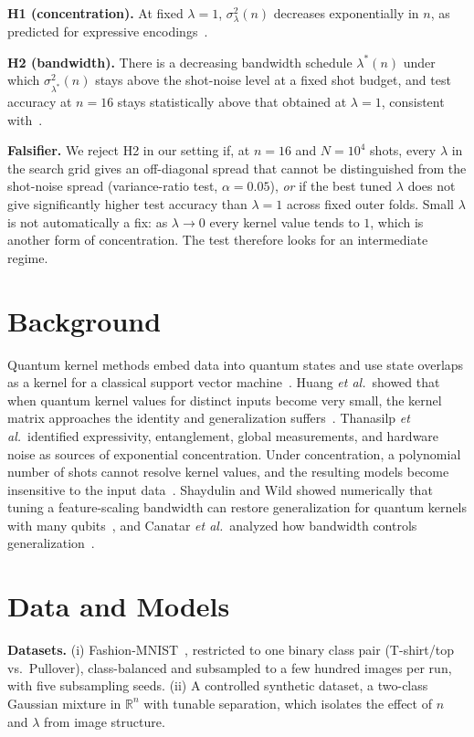 \documentclass[conference]{IEEEtran}
\begin{document}
\textbf{H1 (concentration).} At fixed $\lambda=1$, $\sigma^{2}_{\lambda}(n)$ decreases exponentially in $n$, as predicted for expressive encodings~\cite{thanasilp2024concentration}.

\textbf{H2 (bandwidth).} There is a decreasing bandwidth schedule $\lambda^{*}(n)$ under which $\sigma^{2}_{\lambda^{*}}(n)$ stays above the shot-noise level at a fixed shot budget, and test accuracy at $n=16$ stays statistically above that obtained at $\lambda=1$, consistent with~\cite{shaydulin2022bandwidth,canatar2022bandwidth}.

\textbf{Falsifier.} We reject H2 in our setting if, at $n=16$ and $N=10^{4}$ shots, every $\lambda$ in the search grid gives an off-diagonal spread that cannot be distinguished from the shot-noise spread (variance-ratio test, $\alpha=0.05$), \emph{or} if the best tuned $\lambda$ does not give significantly higher test accuracy than $\lambda=1$ across fixed outer folds. Small $\lambda$ is not automatically a fix: as $\lambda\to0$ every kernel value tends to $1$, which is another form of concentration. The test therefore looks for an intermediate regime.

\section{Background}
Quantum kernel methods embed data into quantum states and use state overlaps as a kernel for a classical support vector machine~\cite{havlicek2019supervised,schuld2019feature}. Huang \emph{et al.}\ showed that when quantum kernel values for distinct inputs become very small, the kernel matrix approaches the identity and generalization suffers~\cite{huang2021power}. Thanasilp \emph{et al.}\ identified expressivity, entanglement, global measurements, and hardware noise as sources of exponential concentration. Under concentration, a polynomial number of shots cannot resolve kernel values, and the resulting models become insensitive to the input data~\cite{thanasilp2024concentration}. Shaydulin and Wild showed numerically that tuning a feature-scaling bandwidth can restore generalization for quantum kernels with many qubits~\cite{shaydulin2022bandwidth}, and Canatar \emph{et al.}\ analyzed how bandwidth controls generalization~\cite{canatar2022bandwidth}.

\section{Data and Models}
\textbf{Datasets.} (i) Fashion-MNIST~\cite{xiao2017fashion}, restricted to one binary class pair (T-shirt/top vs.\ Pullover), class-balanced and subsampled to a few hundred images per run, with five subsampling seeds. (ii) A controlled synthetic dataset, a two-class Gaussian mixture in $\mathbb{R}^{n}$ with tunable separation, which isolates the effect of $n$ and $\lambda$ from image structure.
\end{document}
